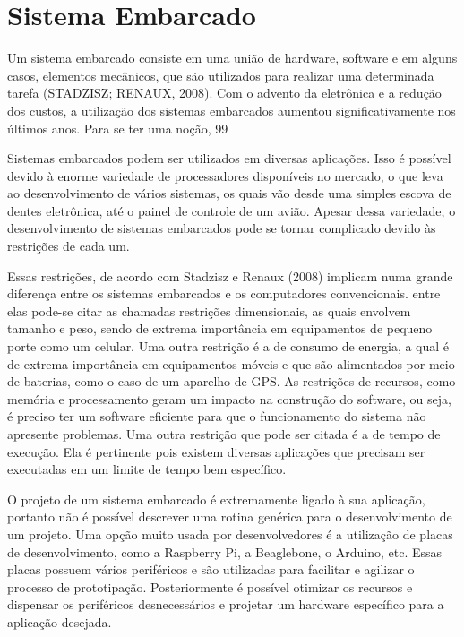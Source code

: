 \section[Sistema Embarcado]{Sistema Embarcado}

Um sistema embarcado consiste em uma união de hardware, software e em alguns casos, elementos mecânicos, que são utilizados para realizar uma determinada tarefa (STADZISZ; RENAUX, 2008). Com o advento da eletrônica e a redução dos custos, a utilização dos sistemas embarcados aumentou significativamente nos últimos anos. Para se ter uma noção, 99%

Sistemas embarcados podem ser utilizados em diversas aplicações. Isso é possível devido à enorme variedade de processadores disponíveis no mercado, o que leva ao desenvolvimento de vários sistemas, os quais vão desde uma simples escova de dentes eletrônica, até o painel de controle de um avião. Apesar dessa variedade, o desenvolvimento de sistemas embarcados pode se tornar complicado devido às restrições de cada um. 

Essas restrições, de acordo com Stadzisz e Renaux (2008) implicam numa grande diferença entre os sistemas embarcados e os computadores convencionais. entre elas pode-se citar as chamadas restrições dimensionais, as quais envolvem tamanho e peso, sendo de extrema importância em equipamentos de pequeno porte como um celular. Uma outra restrição é a de consumo de energia, a qual é de extrema importância em equipamentos móveis e que são alimentados por meio de baterias, como o caso de um aparelho de GPS. As restrições de recursos, como memória e processamento geram um impacto na construção do software, ou seja, é preciso ter um software eficiente para que o funcionamento do sistema não apresente problemas. Uma outra restrição que pode ser citada é a de tempo de execução. Ela é pertinente pois existem diversas aplicações que precisam ser executadas em um limite de tempo bem específico.

O projeto de um sistema embarcado é extremamente ligado à sua aplicação, portanto não é possível descrever uma rotina genérica para o desenvolvimento de um projeto. Uma opção muito usada por desenvolvedores é a utilização de placas de desenvolvimento, como a Raspberry Pi, a Beaglebone, o Arduino, etc. Essas placas possuem vários periféricos e são utilizadas para facilitar e agilizar o processo de prototipação. Posteriormente é possível otimizar
os recursos e dispensar os periféricos desnecessários e projetar um hardware específico para a aplicação desejada.